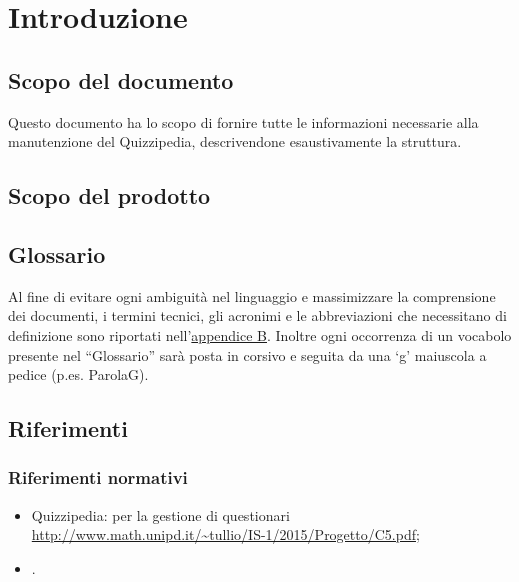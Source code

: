 \documentclass[a4paper, titlepage]{article}
\begin{document}
\pagestyle{fancy}	

\maketitle



\newpage
\tableofcontents

\newpage
\listoffigures

\newpage
\listoftables

\newpage
\clearpage
{}

	\section{Introduzione}
	\subsection{Scopo del documento}
	Questo documento ha lo scopo di fornire tutte le informazioni necessarie alla manutenzione del 
	Quizzipedia, descrivendone esaustivamente la struttura.
	
	\subsection{Scopo del prodotto}
	\SCOPO
	
	\subsection{Glossario}
	Al fine di evitare ogni ambiguità nel linguaggio e massimizzare la comprensione dei documenti, i termini tecnici, gli acronimi e le abbreviazioni che necessitano di definizione sono riportati nell'\hyperref[gl]{appendice B}.
	Inoltre ogni occorrenza di un vocabolo presente nel “Glossario” sarà posta in corsivo e seguita da
	una ‘g’ maiuscola a pedice (p.es. ParolaG).
	
	\subsection{Riferimenti}	
	\subsubsection{Riferimenti normativi}
	\begin{itemize}
		\item {} Quizzipedia:  per la gestione di questionari \newline \url{http://www.math.unipd.it/~tullio/IS-1/2015/Progetto/C5.pdf};
		\item {} \NdPdoc.
	\end{itemize}
	\newpage
	
\end{document}

